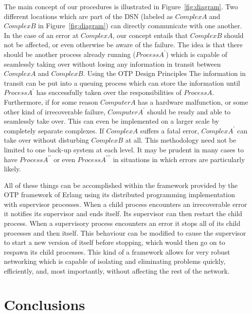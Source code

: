 \documentclass[aps,twocolumn,nobalancelastpage,amsmath,amssymb,
nofootinbib,superscriptaddress, ]{revtex4}
\begin{document}
The main concept of our procedures is illustrated in Figure~\ref{fig:diagram}. Two different locations which are part of the DSN (labeled as $Complex A$ and $Complex B$ in Figure~\ref{fig:diagram}) can directly communicate with one another. In the case of an error at $Complex A$, our concept entails that $Complex B$ should not be affected, or even otherwise be aware of the failure. The idea is that there should be another process already running ($Process A^\prime$) which is capable of seamlessly taking over without losing any information in transit between $Complex A$ and $Complex B$. Using the OTP Design Principles The information in transit can be put into a queuing process which can store the information until $Process A^\prime$ has successfully taken over the responsibilities of $Process A$. \cite{cesarini2009} Furthermore, if for some reason $Computer A$ has a hardware malfunction, or some other kind of irrecoverable failure, $Computer A^\prime$ should be ready and able to seamlessly take over. This can even be implemented on a larger scale by completely separate complexes. If $Complex A$ suffers a fatal error, $Complex A^\prime$ can take over without disturbing $Complex B$ at all. This methodology need not be limited to one back-up system at each level. It may be prudent in many cases to have $Process A^{\prime \prime}$ or even $Process A^{\prime \prime \prime}$ in situations in which errors are particularly likely.

All of these things can be accomplished within the framework provided by the OTP framework of Erlang using its distributed programming implementation with supervisor processes. \cite{logan2011} When a child process encounters an irrecoverable error it notifies its supervisor and ends itself. Its supervisor can then restart the child process. When a supervisory process encounters an error it stops all of its child processes and then itself. This behaviour can be modified to cause the supervisor to start a new version of itself before stopping, which would then go on to respawn its child processes. This kind of a framework allows for very robust networking which is capable of isolating and eliminating problems quickly, efficiently, and, most importantly, without affecting the rest of the network.


\section{Conclusions}
\end{document}

